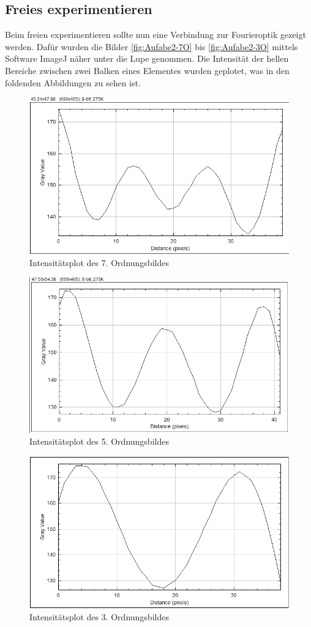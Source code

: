 \documentclass[12pt,a4paper,twoside]{article}
\begin{document}
\subsection{Freies experimentieren}

Beim freien experimentieren sollte nun eine Verbindung zur Fourieroptik gezeigt werden.
Dafür wurden die Bilder \ref{fig:Aufabe2-7O} bis \ref{fig:Aufabe2-3O} mittels Software ImageJ näher unter die Lupe genommen.
Die Intensität der hellen Bereiche zwischen zwei Balken eines Elementes wurden geplotet, was in den foldenden Abbildungen zu sehen ist.

\begin{figure}[H]
    \centering
    \includegraphics[width=0.6\linewidth]{nudes/A3_O7_Plot.png}
    \caption{Intensitätsplot des 7. Ordnungsbildes}
    \label{fig:IntensitätsPlotO7}
\end{figure}

\begin{figure}[H]
    \centering
    \includegraphics[width=0.6\linewidth]{nudes/A3_O5_Plot.png}
    \caption{Intensitätsplot des 5. Ordnungsbildes}
    \label{fig:IntensitätsPlotO5}
\end{figure}

\begin{figure}[H]
    \centering
    \includegraphics[width=0.6\linewidth]{nudes/A3_O3_Plot.png}
    \caption{Intensitätsplot des 3. Ordnungsbildes}
    \label{fig:IntensitätsPlotO3}
\end{figure}
\end{document}
